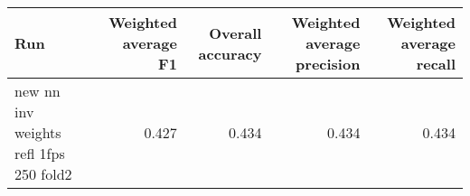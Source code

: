 \begin{tabular}{lrrrr}
\toprule
Run & Weighted average F1 & Overall accuracy & Weighted average precision & Weighted average recall \\
\midrule
new nn inv weights refl 1fps 250 fold2 & 0.427 & 0.434 & 0.434 & 0.434 \\
\bottomrule
\end{tabular}
